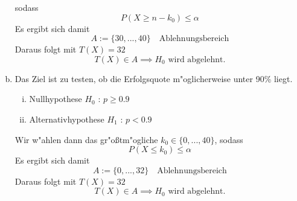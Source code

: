 \begin{enumerate}[(a)]
        sodass
        \begin{equation*}
            P(X \geq n - k_0) \leq \alpha
        \end{equation*}
        Es ergibt sich damit
        \begin{equation*}
            A := \{30,...,40\} \quad \text{Ablehnungsbereich}
        \end{equation*}
        Daraus folgt mit $T(X) = 32$
        \begin{equation*}
            T(X) \in A \implies H_0 \text{ wird abgelehnt.}
        \end{equation*}
    \item Das Ziel ist zu testen, ob die Erfolgsquote m"oglicherweise unter 90\%
        liegt.
        \begin{enumerate}[i)]
            \item Nullhypothese $H_0$ : $p \geq 0.9$
            \item Alternativhypothese $H_1$ : $p < 0.9$
        \end{enumerate}
        Wir w"ahlen dann das gr"o{\ss}tm"ogliche $k_0 \in \{0,...,40\}$,
        sodass
        \begin{equation*}
            P(X \leq k_0) \leq \alpha
        \end{equation*}
        Es ergibt sich damit
        \begin{equation*}
            A := \{0,...,32\} \quad \text{Ablehnungsbereich}
        \end{equation*}
        Daraus folgt mit $T(X) = 32$
        \begin{equation*}
            T(X) \in A \implies H_0 \text{ wird abgelehnt.}
        \end{equation*}
\end{enumerate}
